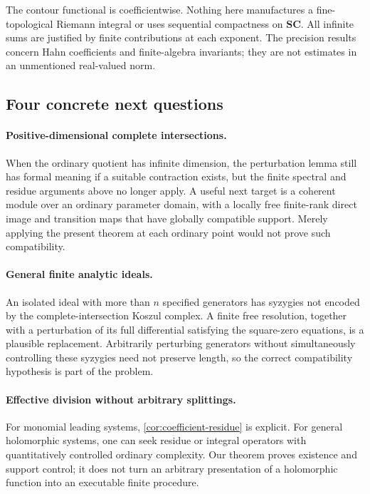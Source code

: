 \documentclass[11pt,letterpaper]{article}
\theoremstyle{definition}
\theoremstyle{remark}
\newcommand{\SC}{\mathbf{SC}}
\numberwithin{equation}{section}
\begin{document}
The contour functional is coefficientwise. Nothing here manufactures a fine-topological Riemann integral or uses sequential compactness on $\SC$. All infinite sums are justified by finite contributions at each exponent. The precision results concern Hahn coefficients and finite-algebra invariants; they are not estimates in an unmentioned real-valued norm.

\subsection{Four concrete next questions}
\paragraph{Positive-dimensional complete intersections.}
When the ordinary quotient has infinite dimension, the perturbation lemma still has formal meaning if a suitable contraction exists, but the finite spectral and residue arguments above no longer apply. A useful next target is a coherent module over an ordinary parameter domain, with a locally free finite-rank direct image and transition maps that have globally compatible support. Merely applying the present theorem at each ordinary point would not prove such compatibility.

\paragraph{General finite analytic ideals.}
An isolated ideal with more than $n$ specified generators has syzygies not encoded by the complete-intersection Koszul complex. A finite free resolution, together with a perturbation of its full differential satisfying the square-zero equations, is a plausible replacement. Arbitrarily perturbing generators without simultaneously controlling these syzygies need not preserve length, so the correct compatibility hypothesis is part of the problem.

\paragraph{Effective division without arbitrary splittings.}
For monomial leading systems, \cref{cor:coefficient-residue} is explicit. For general holomorphic systems, one can seek residue or integral operators with quantitatively controlled ordinary complexity. Our theorem proves existence and support control; it does not turn an arbitrary presentation of a holomorphic function into an executable finite procedure.
\end{document}
